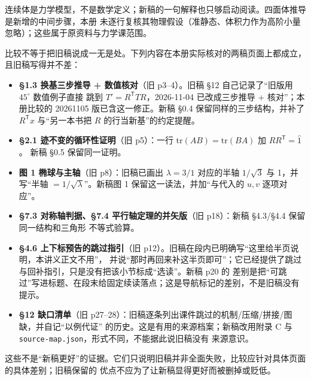\documentclass[11pt]{ctexart}
\newcommand{\bndlbl}{\par\smallskip\noindent{\bfseries\color{violetdeep}边界与未验证。}\hspace{0.2em}}
\newcommand{\srcsmall}[1]{{\small\color{inkgray}#1}}
\begin{document}
\bndlbl 连续体是力学模型，不是数学定义；新稿的一句解释也只够启动阅读。四面体推导是新增的中间步骤，本册
未逐行复核其物理假设（准静态、体积力作为高阶小量忽略）；这些属于原资料与力学课范围。

\clearpage
{}

比较不等于把旧稿说成一无是处。下列内容在本册实际核对的两稿页面上都成立，且旧稿写得并不差：

\begin{itemize}
\item \textbf{§1.3 换基三步推导 + 数值核对}（旧 p3--4）。旧稿 §12 自己记录了“旧版用 $45^\circ$ 数值例子直接
跳到 $T'=R^{\mathsf T}TR$，2026-11-04 已改成三步推导 + 核对”；本册比较的 20261105 版已含这一修正。新稿
§0.4 保留同样的三步结构，并补了 $R^{\mathsf T}x$ 与“另一本书把 $R$ 的行当新基”的约定提醒。
\item \textbf{§2.1 迹不变的循环性证明}（旧 p5）：一行 $\mathrm{tr}(AB)=\mathrm{tr}(BA)$ 加 $RR^{\mathsf T}=\hat1$。
新稿 §0.5 保留同一证明。
\item \textbf{图 1 椭球与主轴}（旧 p8）：旧稿已画出 $\lambda=3/1$ 对应的半轴 $1/\sqrt3$ 与 1，并写“半轴
$=1/\sqrt\lambda$”。新稿图 1 保留这一读法，并加“与代入的 $u,v$ 逐项对应”。
\item \textbf{§7.3 对称轴判据、§7.4 平行轴定理的并矢版}（旧 p18）：新稿 §4.3/§4.4 保留同一结构和三角形
不等式验算。
\item \textbf{§4.6 上下标预告的跳过指引}（旧 p12）。旧稿在段内已明确写“这里给半页说明，本讲义正文不用”，
并说“那时再回来补这半页即可”；它已经提供了跳过与回补指引，只是没有把该小节标成“选读”。新稿 p20 的
差别是把“可跳过”写进标题、在段末给固定续读落点；这是导航标记的差别，不是旧稿没有提示。
\item \textbf{§12 缺口清单}（旧 p27--28）：旧稿逐条列出课件跳过的机制/压缩/拼接/图缺，并自记“以例代证”
的历史。这是有用的来源档案；新稿改用附录 C 与 \texttt{source-map.json}，形式不同，不能据此说旧稿没有
来源意识。
\end{itemize}

\srcsmall{这些不是“新稿更好”的证据。它们只说明旧稿并非全面失败，比较应针对具体页面的具体差别；旧稿保留的
优点不应为了让新稿显得更好而被删掉或贬低。}

\end{document}
